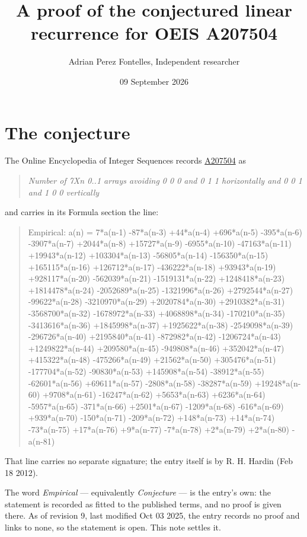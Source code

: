 \documentclass[11pt]{article}
\title{A proof of the conjectured linear recurrence for OEIS A207504}
\author{Adrian Perez Fontelles, Independent researcher}
\date{09 September 2026}
\theoremstyle{definition}
\begin{document}
\maketitle
\section{The conjecture}

The Online Encyclopedia of Integer Sequences records \href{https://oeis.org/A207504}{A207504} as

\begin{quote}\itshape Number of 7Xn 0..1 arrays avoiding 0 0 0 and 0 1 1 horizontally and 0 0 1 and 1 0 0 vertically\end{quote}

and carries in its Formula section the line:

\begin{quote}\ttfamily Empirical: a(n) = 7*a(n-1) -87*a(n-3) +44*a(n-4) +696*a(n-5) -395*a(n-6) -3907*a(n-7) +2044*a(n-8) +15727*a(n-9) -6955*a(n-10) -47163*a(n-11) +19943*a(n-12) +103304*a(n-13) -56805*a(n-14) -156350*a(n-15) +165115*a(n-16) +126712*a(n-17) -436222*a(n-18) +93943*a(n-19) +928117*a(n-20) -562039*a(n-21) -1519131*a(n-22) +1248418*a(n-23) +1814478*a(n-24) -2052689*a(n-25) -1321996*a(n-26) +2792544*a(n-27) -99622*a(n-28) -3210970*a(n-29) +2020784*a(n-30) +2910382*a(n-31) -3568700*a(n-32) -1678972*a(n-33) +4068898*a(n-34) -170210*a(n-35) -3413616*a(n-36) +1845998*a(n-37) +1925622*a(n-38) -2549098*a(n-39) -296726*a(n-40) +2195840*a(n-41) -872982*a(n-42) -1206724*a(n-43) +1249822*a(n-44) +209580*a(n-45) -949808*a(n-46) +352042*a(n-47) +415322*a(n-48) -475266*a(n-49) +21562*a(n-50) +305476*a(n-51) -177704*a(n-52) -90830*a(n-53) +145908*a(n-54) -38912*a(n-55) -62601*a(n-56) +69611*a(n-57) -2808*a(n-58) -38287*a(n-59) +19248*a(n-60) +9708*a(n-61) -16247*a(n-62) +5653*a(n-63) +6236*a(n-64) -5957*a(n-65) -371*a(n-66) +2501*a(n-67) -1209*a(n-68) -616*a(n-69) +939*a(n-70) -150*a(n-71) -209*a(n-72) +148*a(n-73) +14*a(n-74) -73*a(n-75) +17*a(n-76) +9*a(n-77) -7*a(n-78) +2*a(n-79) +2*a(n-80) -a(n-81)\end{quote}

That line carries no separate signature; the entry itself is by R. H. Hardin (Feb 18 2012).

The word {\itshape Empirical} --- equivalently {\itshape Conjecture} --- is the entry's own: the statement is recorded as fitted to the published terms, and no proof is given there. As of revision 9, last modified Oct 03 2025, the entry records no proof and links to none, so the statement is open. This note settles it.
\end{document}
